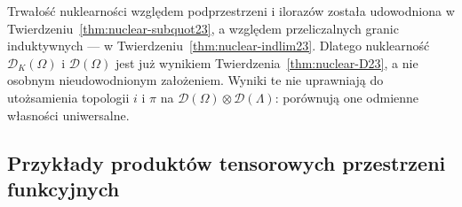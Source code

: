 \begin{uwaga}
\label{rem:nuclear-permanence24}
Trwałość nuklearności względem podprzestrzeni i ilorazów
została udowodniona w
Twierdzeniu~\ref{thm:nuclear-subquot23}, a względem
przeliczalnych granic induktywnych --- w
Twierdzeniu~\ref{thm:nuclear-indlim23}.
Dlatego nuklearność $\mathcal D_K(\Omega)$ i
$\mathcal D(\Omega)$ jest już wynikiem
Twierdzenia~\ref{thm:nuclear-D23}, a nie osobnym
nieudowodnionym założeniem. Wyniki te nie uprawniają
do utożsamienia topologii $i$ i $\pi$ na
$\mathcal D(\Omega)\otimes\mathcal D(\Lambda)$:
porównują one odmienne własności uniwersalne.
\end{uwaga}

\subsection{Przykłady produktów tensorowych przestrzeni funkcyjnych}

